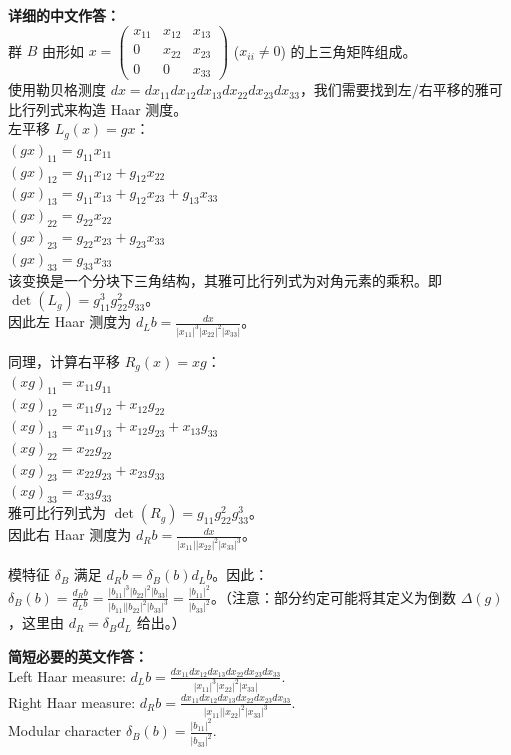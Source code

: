 \documentclass{ctexart}
\begin{document}
\vspace{1em}
\textbf{详细的中文作答：}\\
群 $B$ 由形如 $x = \begin{pmatrix} x_{11} & x_{12} & x_{13} \\ 0 & x_{22} & x_{23} \\ 0 & 0 & x_{33} \end{pmatrix}$ ($x_{ii} \neq 0$) 的上三角矩阵组成。\\
使用勒贝格测度 $dx = dx_{11} dx_{12} dx_{13} dx_{22} dx_{23} dx_{33}$，我们需要找到左/右平移的雅可比行列式来构造 Haar 测度。\\
左平移 $L_g(x) = gx$：\\
$(gx)_{11} = g_{11}x_{11}$\\
$(gx)_{12} = g_{11}x_{12} + g_{12}x_{22}$\\
$(gx)_{13} = g_{11}x_{13} + g_{12}x_{23} + g_{13}x_{33}$\\
$(gx)_{22} = g_{22}x_{22}$\\
$(gx)_{23} = g_{22}x_{23} + g_{23}x_{33}$\\
$(gx)_{33} = g_{33}x_{33}$\\
该变换是一个分块下三角结构，其雅可比行列式为对角元素的乘积。即 $\det(L_g) = g_{11}^3 g_{22}^2 g_{33}$。\\
因此左 Haar 测度为 $d_L b = \frac{dx}{|x_{11}|^3 |x_{22}|^2 |x_{33}|}$。

同理，计算右平移 $R_g(x) = xg$：\\
$(xg)_{11} = x_{11}g_{11}$\\
$(xg)_{12} = x_{11}g_{12} + x_{12}g_{22}$\\
$(xg)_{13} = x_{11}g_{13} + x_{12}g_{23} + x_{13}g_{33}$\\
$(xg)_{22} = x_{22}g_{22}$\\
$(xg)_{23} = x_{22}g_{23} + x_{23}g_{33}$\\
$(xg)_{33} = x_{33}g_{33}$\\
雅可比行列式为 $\det(R_g) = g_{11} g_{22}^2 g_{33}^3$。\\
因此右 Haar 测度为 $d_R b = \frac{dx}{|x_{11}| |x_{22}|^2 |x_{33}|^3}$。

模特征 $\delta_B$ 满足 $d_R b = \delta_B(b) d_L b$。因此：\\
$\delta_B(b) = \frac{d_R b}{d_L b} = \frac{|b_{11}|^3 |b_{22}|^2 |b_{33}|}{|b_{11}| |b_{22}|^2 |b_{33}|^3} = \frac{|b_{11}|^2}{|b_{33}|^2}$。（注意：部分约定可能将其定义为倒数 $\Delta(g)$，这里由 $d_R = \delta_B d_L$ 给出。）

\vspace{1em}
\textbf{简短必要的英文作答：}\\
Left Haar measure: $d_L b = \frac{dx_{11} dx_{12} dx_{13} dx_{22} dx_{23} dx_{33}}{|x_{11}|^3 |x_{22}|^2 |x_{33}|}$.\\
Right Haar measure: $d_R b = \frac{dx_{11} dx_{12} dx_{13} dx_{22} dx_{23} dx_{33}}{|x_{11}| |x_{22}|^2 |x_{33}|^3}$.\\
Modular character $\delta_B(b) = \frac{|b_{11}|^2}{|b_{33}|^2}$.
\end{document}
